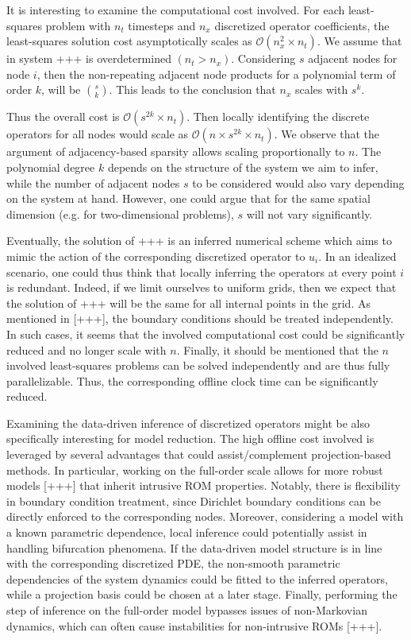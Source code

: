 \documentclass[%
  twocolumn
]{mpi2015-cscpreprint}
\begin{document}
It is interesting to examine the computational cost involved. For each least-squares problem with $n_t$ timesteps and $n_x$ discretized operator coefficients, the least-squares solution cost asymptotically scales as $\mathcal{O}(n_x^2 \times n_t)$. We assume that in system +++ is overdetermined $(n_t>n_x)$. Considering $s$ adjacent nodes for node $i$, then the non-repeating adjacent node products for a polynomial term of order $k$, will be $s \choose k$. This leads to the conclusion that $n_x$ scales with $s^k$. 

Thus the overall cost is $\mathcal{O}(s^{2k} \times n_t)$. Then locally identifying the discrete operators for all nodes would scale as $\mathcal{O}(n \times s^{2k} \times n_t)$. We observe that the argument of adjacency-based sparsity allows scaling proportionally to $n$. The polynomial degree $k$ depends on the structure of the system we aim to infer, while the number of adjacent nodes $s$  to be considered would also vary depending on the system at hand. However, one could argue that for the same spatial dimension (e.g. for two-dimensional problems), $s$ will not vary significantly.


Eventually, the solution of +++ is an inferred numerical scheme which aims to mimic the action of the corresponding discretized operator to $u_i$. In an idealized scenario, one could thus think that locally inferring the operators at every point $i$ is redundant. Indeed, if we limit ourselves to uniform grids, then we expect that the solution of +++ will be the same for all internal points in the grid. As mentioned in [+++], the boundary conditions should be treated independently. In such cases, it seems that the involved computational cost could be significantly reduced and no longer scale with $n$. Finally, it should be mentioned that the $n$ involved least-squares problems can be solved independently and are thus fully parallelizable. Thus, the corresponding offline clock time can be significantly reduced.


Examining the data-driven inference of discretized operators might be also specifically interesting for model reduction. The high offline cost involved is leveraged by several advantages that could assist/complement projection-based methods. In particular, working on the full-order scale allows for more robust models [+++] that inherit intrusive ROM properties. Notably, there is flexibility in boundary condition treatment, since Dirichlet boundary conditions can be directly enforced to the corresponding nodes. Moreover, considering a model with a known parametric dependence, local inference could potentially assist in handling bifurcation phenomena. If the data-driven model structure is in line with the corresponding discretized PDE, the non-smooth parametric dependencies of the system dynamics could be fitted to the inferred operators, while a projection basis could be chosen at a later stage. Finally, performing the step of inference on the full-order model bypasses issues of non-Markovian dynamics, which can often cause instabilities for non-intrusive ROMs [+++].
\end{document}
